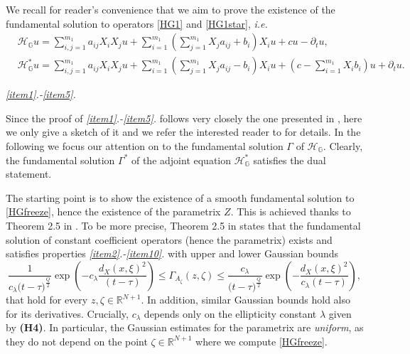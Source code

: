 \documentclass[11pt,a4paper]{article}
\numberwithin{equation}{section}
\def \rnn {{\mathbb {R}}^{N+1}}
\def \GG {{\mathbb{G}}}
\def \p {\partial}
\def \H {\mathscr{H}_\GG}
\def \HH{\mathscr{H}_\GG^*}
\def \G {{\Gamma}}
\def \l {{\lambda}}
\def \t {{\tau}}
\def \x {{\xi}}
\def \z {{\zeta}}
\begin{document}
\medskip{}
\begin{pf-fundamental}
	We recall for reader's convenience that we aim to prove the existence of the fundamental solution to operators \eqref{HG1} and \eqref{HG1star}, \emph{i.e.}
	\begin{equation}\label{HG2}
		\begin{aligned}
			&\H u =\sum_{i,j=1}^{m_1} a_{ij}X_iX_ju +\sum_{i=1}^{m_1}\left( \sum_{j=1}^{m_1}X_ja_{ij} + b_i\right)X_iu+ cu-\p_t u,\\
			&\HH u =\sum_{i,j=1}^{m_1} a_{ij}X_iX_ju + \sum_{i=1}^{m_1}\left( \sum_{j=1}^{m_1}X_ja_{ij} - b_i\right)X_iu+ \left(c-\sum_{i=1}^{m_1}X_ib_i\right)u+\p_t u. 
		\end{aligned}
	\end{equation}
	
	 
	 
	\medskip\emph{\ref{item1}.-\ref{item5}.}
	 
	 
	Since the proof of \emph{\ref{item1}.-\ref{item5}.} follows very closely the one presented in \cite{bonfiglioli2004fundamental}, here we only give a sketch of it and we refer the interested reader to \cite{bonfiglioli2004fundamental} for details. In the following we focus our attention on to the fundamental solution $\G$ of $\H$. Clearly, the fundamental solution $\G^*$ of the adjoint equation $\HH$ satisfies the dual statement.
	 
	 
	The starting point is to show the existence of a smooth fundamental solution to \eqref{HGfreeze}, hence the existence of the parametrix $Z$. This is achieved thanks to Theorem 2.5 in \cite{bonfiglioli2002uniform}. To be more precise, Theorem 2.5 in \cite{bonfiglioli2002uniform} states that the fundamental solution of constant coefficient operators (hence the parametrix) exists and satisfies properties \emph{\ref{item2}.-\ref{item10}.} with upper and lower Gaussian bounds
	\begin{equation}\label{gaussian-parametrix}
		\frac{1}{c_\l\big(t-\t\big)^{\frac{Q}{2}}}\exp{\left(-c_\l\frac{d_X(x,\x)^2}{(t-\t)}\right)}\leq \G_{A_\z}(z,\z) \leq  \frac{c_\l}{\big(t-\t\big)^{\frac{Q}{2}}}\exp{\left(-\frac{d_X(x,\x)^2}{c_\l(t-\t)}\right)},
	\end{equation}
	that hold for every $z,\z \in \rnn$. In addition, similar Gaussian bounds hold also for its derivatives. Crucially, $c_\l$ depends only on the ellipticity constant $\lambda$ given by \textbf{(H4)}. In particular, the Gaussian estimates for the parametrix are \emph{uniform}, as they do not depend on the point $\z\in\rnn$ where we compute \eqref{HGfreeze}. 
	 

\end{pf-fundamental}
\end{document}
